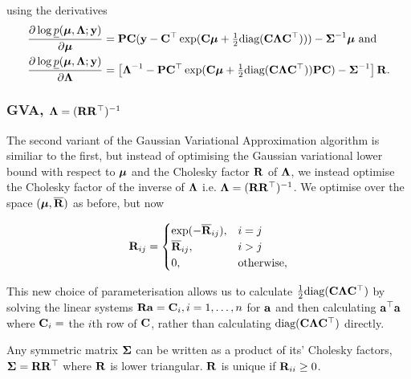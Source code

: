 \documentclass[times, doublespace]{anzsauth}
\begin{document}
	using the derivatives
	\begin{align*}
		\frac{\partial \log \underline{p}({\boldsymbol \mu}, {\boldsymbol \Lambda}; {\bf y})}{\partial {\boldsymbol\mu}}     & = {\bf P} {\bf C} ({\bf y} - {\bf C}^\top \exp({\bf C} {\boldsymbol \mu} + \tfrac{1}{2} \text{diag}{({\bf C}{\boldsymbol\Lambda}{\bf C}^\top)})) - {\boldsymbol \Sigma}^{-1} {\boldsymbol \mu} \text{ and}                \\
		\frac{\partial \log \underline{p}({\boldsymbol \mu}, {\boldsymbol \Lambda}; {\bf y})}{\partial {\boldsymbol\Lambda}} & = \left [{\boldsymbol \Lambda}^{-1} - {\bf P} {\bf C}^\top \exp({\bf C} {\boldsymbol \mu} + \tfrac{1}{2} \text{diag}({\bf C} {\boldsymbol \Lambda} {\bf C}^\top)) {\bf P} {\bf C}) - {\boldsymbol \Sigma}^{-1} \right ] {\bf R}. 
	\end{align*}
	
	\subsubsection{GVA, ${\boldsymbol \Lambda} = ({\bf R} {\bf R}^\top)^{-1}$}
	
	\noindent The second variant of the Gaussian Variational Approximation algorithm is similiar to the first, but
	instead of optimising the Gaussian variational lower bound with respect to ${\boldsymbol \mu}$ and the Cholesky factor
	${\bf R}$ of ${\boldsymbol \Lambda}$, we instead optimise the Cholesky factor of the inverse of ${\boldsymbol \Lambda}$ i.e. ${\boldsymbol \Lambda} =
	({\bf R} {\bf R}^\top)^{-1}$. We optimise over the space $({\boldsymbol \mu}, \overline{{\bf R}})$ as before, but now 
	
	\begin{equation*}
		{\bf R}_{ij} =
		\begin{cases}
			\exp(-\overline{{\bf R}}_{ij}), & i = j             \\
			\overline{{\bf R}}_{ij},        & i > j             \\
			0,                          & \text{otherwise}, 
		\end{cases}
	\end{equation*}

  \noindent This new choice of parameterisation allows us to calculate $\tfrac{1}{2} \text{diag}({\bf C} {\boldsymbol \Lambda}
	{\bf C}^\top)$ by solving the linear systems ${\bf R} {\bf a} = {\bf C}_{i}, i=1, \ldots, n$ for   ${\bf a}$ and then calculating
	${\bf a}^\top{\bf a}$ where ${\bf C}_{i} = $ the $i$th row of ${\bf C}$, rather than calculating $\text{diag}({\bf C} {\boldsymbol \Lambda}
	{\bf C}^\top)$ directly.
	
	Any symmetric matrix ${\boldsymbol \Sigma}$ can be written as a product of its' Cholesky factors, ${\boldsymbol \Sigma} = {\bf R} {\bf R}^\top$
  where ${\bf R}$ is lower triangular. ${\bf R}$ is unique if ${\bf R}_{ii} \geq 0$. 
\end{document}
